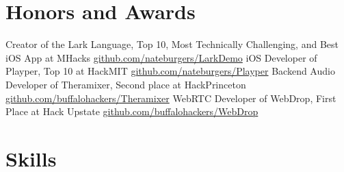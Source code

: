 \documentclass[11pt,a4paper,sans]{moderncv}   %
\begin{document}
\section{Honors and Awards}
 {Creator of the Lark Language, Top 10, Most Technically Challenging, and Best iOS App at MHacks \newline \url{github.com/nateburgers/LarkDemo}}
 {iOS Developer of Playper, Top 10 at HackMIT \newline \url{github.com/nateburgers/Playper}}
 {Backend Audio Developer of Theramixer, Second place at HackPrinceton \newline \url{github.com/buffalohackers/Theramixer}}
 {WebRTC Developer of WebDrop, First Place at Hack Upstate \newline \url{github.com/buffalohackers/WebDrop}}

\section{Skills}
\end{document}
